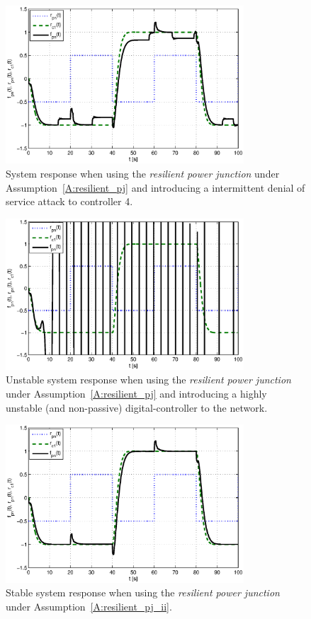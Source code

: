\begin{figure}
  \centering
  \includegraphics[width=3.5in]{figures/fault_detection_off_denial}
  \caption{System response when using the {\em resilient power
    junction} under Assumption~\ref{A:resilient_pj} and introducing a
    intermittent denial of service attack to controller 4.}
  \label{fig:fault_detection_off_denial}
\end{figure}
\begin{figure}
  \centering
  \includegraphics[width=3.5in]{figures/fault_detection_off}
  \caption{Unstable system response when using the {\em resilient power
    junction} under Assumption~\ref{A:resilient_pj} and introducing a
    highly unstable (and non-passive) digital-controller to the network.}
  \label{fig:fault_detection_off}
\end{figure}
\begin{figure}
  \centering
  \includegraphics[width=3.5in]{figures/fault_detection_on}
  \caption{Stable system response when using the {\em resilient power
      junction} under Assumption~\ref{A:resilient_pj_ii}.}
  \label{fig:fault_detection_on}
\end{figure}
